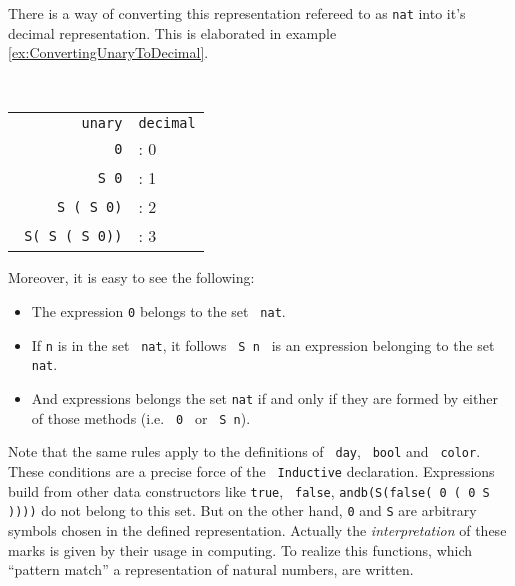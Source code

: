 	  There is a way of converting this representation refereed to as \lstinline!nat! into it's decimal representation. 
	  This is elaborated in example \ref{ex:ConvertingUnaryToDecimal}.
	  \begin{example} \label{ex:ConvertingUnaryToDecimal} ~\\%
	  \begin{center}  
		  \begin{tabular} {r l}
		  
			  \texttt{unary}				& \texttt{decimal}	\\
			  \texttt{\lstinline!0!} 		&: 0 				\\
			  \texttt{\lstinline! S 0!}  	&: 1				\\
			  \texttt{\lstinline! S ( S 0)!}	&: 2			\\
			  \texttt{\lstinline! S( S ( S 0))!}	&: 3		\\
			    
		  \end{tabular}
		  \end{center}
	  \end{example}
	  Moreover, it is easy to see the following: 
	  \begin{itemize}
	  \item The expression \lstinline!0! belongs to the set \lstinline! nat!.
	  \item If \lstinline!n! is in the set \lstinline! nat!, it follows \lstinline! S n ! is an expression belonging to the set \lstinline! nat!.
	  \item And expressions belongs the set \lstinline!nat! if and only if they are  formed by either of those methods (i.e. \lstinline! 0 ! or  \lstinline! S n!). 
	  \end{itemize}  
	  Note that the same rules apply to the definitions of \lstinline! day!, \lstinline! bool! and \lstinline! color!.
	  These conditions are a precise force of the \lstinline! Inductive! declaration. 
	  Expressions build from other data constructors like \lstinline!true!, \lstinline! false!, \lstinline!andb(S(false( 0 ( 0 S ))))! do not belong to this set.  
	  But on the other hand, \lstinline!0! and \lstinline!S! are arbitrary symbols chosen in the defined representation. 
	  Actually the {\itshape interpretation} of these marks is given by their usage in computing.
	  To realize this functions, which ``pattern match'' a representation of natural numbers, are written.\\
	   

